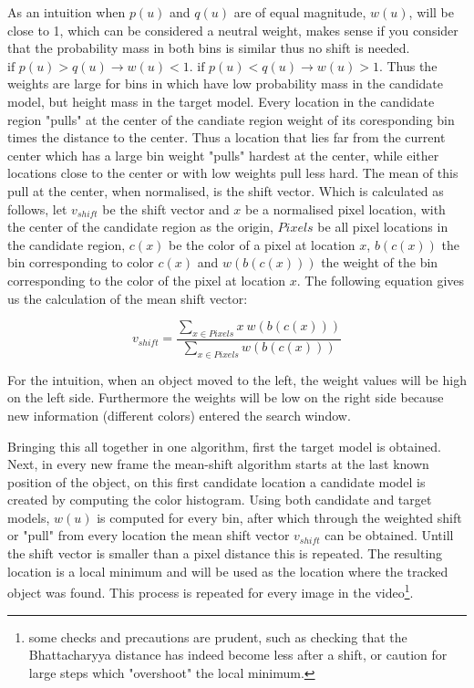 \documentclass[a4paper,11pt]{article}
\begin{document}
As an intuition when $p(u)$ and $q(u)$ are of equal magnitude, $w(u)$, will be close to 1, which can be considered a neutral weight, makes sense if you consider that the probability mass in both bins is similar thus no shift is needed. $\textrm{if }p(u) > q(u) \rightarrow w(u) < 1$.  $\textrm{if }p(u) < q(u) \rightarrow w(u) > 1$. Thus the weights are large for bins in  which have low probability mass in the candidate model, but height mass in the target model. Every location in the candidate region "pulls" at the center of the candiate region  weight of its coresponding bin times the distance to the center. Thus a location that lies far from the current center which has a large bin weight "pulls" hardest at the center, while either locations close to the center or with low weights pull less hard. The mean of this pull at the center, when normalised, is the shift vector. Which is calculated as follows, let $v_{shift}$ be the shift vector and $x$ be a normalised pixel location, with the center of the candidate region as the origin, $Pixels$ be all pixel locations in the candidate region, $c(x)$ be the color of a pixel at location $x$, $b(c(x))$ the bin corresponding to color $c(x)$ and $w(b(c(x)))$ the weight of the bin corresponding to the color of the pixel at location $x$. The following equation gives us the calculation of the mean shift vector:



\begin{equation}
\label{eq:shift vector}
v_{shift}=\frac{\sum_{x\in Pixels} x \ w(b(c(x)))}{\sum_{x\in Pixels} w(b(c(x)))}
\end{equation} %

    

For the intuition, when an object moved to the left, the weight values will be high on the left side. Furthermore the weights will be low on the right side because new information (different colors) entered the search window. 

 

Bringing this all together in one algorithm, first the target model is obtained. Next, in every new frame the mean-shift algorithm starts at the last known position of the object, on this first candidate location a candidate model is created by computing the color histogram. Using both candidate and target models, $w(u)$ is computed for every bin, after which through the weighted shift or "pull" from every location the mean shift vector $v_{shift}$ can be obtained. Untill the shift vector is smaller than a pixel distance this is repeated. The resulting location is a local minimum and will be used as the location where the tracked object was found. This process is repeated for every image in the video\footnote{some checks and precautions are prudent, such as checking that the Bhattacharyya distance has indeed become less after a shift, or caution for large steps which "overshoot" the local minimum. }.
\end{document}

